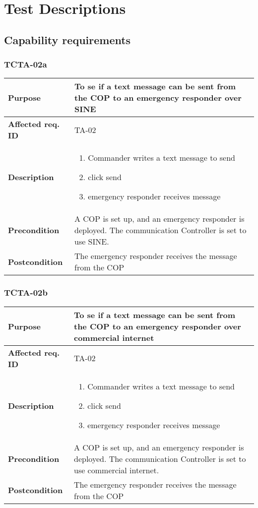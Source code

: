 %
\thispagestyle{fancy}
\chapter{Test Descriptions}
\label{chp:test_descriptions}

\section{Capability requirements}
\label{sec:cap_req}

\subsection{TCTA-02a}
\begin{tabular}{ l | m{11cm}}
	\textbf{Purpose}			& To se if a text message can be sent from the COP to an emergency responder over SINE\\ \hline
	\textbf{Affected req. ID}	& TA-02 \\ \hline
	\textbf{Description}		& \begin{enumerate}
		\item Commander writes a text message to send \item click send \item emergency responder receives message
	\end{enumerate}\\
	\hline
	\textbf{Precondition}		& A COP is set up, and an emergency responder is deployed. The communication Controller is set to use SINE.\\ \hline
	\textbf{Postcondition}		& The emergency responder receives the message from the COP\\
\end{tabular}

\subsection{TCTA-02b}
\begin{tabular}{ l | m{11cm}}
	\textbf{Purpose}			& To se if a text message can be sent from the COP to an emergency responder over commercial internet\\ \hline
	\textbf{Affected req. ID}	& TA-02 \\ \hline
	\textbf{Description}		& \begin{enumerate}
		\item Commander writes a text message to send \item click send \item emergency responder receives message
	\end{enumerate}\\
	\hline
	\textbf{Precondition}		& A COP is set up, and an emergency responder is deployed. The communication Controller is set to use commercial internet.\\ \hline
	\textbf{Postcondition}		& The emergency responder receives the message from the COP\\
\end{tabular}

